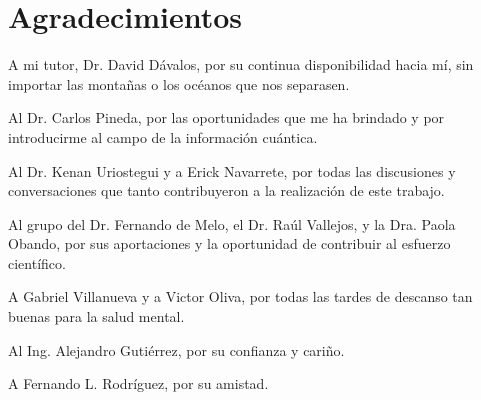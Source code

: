 \section*{Agradecimientos}

A mi tutor, Dr. David Dávalos, por su continua disponibilidad hacia mí, sin importar las montañas o los océanos que nos separasen. 

\vspace{0.2cm}

Al Dr. Carlos Pineda, por las oportunidades que me ha brindado y por introducirme al campo de la información cuántica.

\vspace{0.2cm}

Al Dr. Kenan Uriostegui y a Erick Navarrete, por todas las discusiones y conversaciones que tanto contribuyeron a la realización de este trabajo. 

\vspace{0.2cm}

Al grupo del Dr. Fernando de Melo, el Dr. Raúl Vallejos, y la Dra. Paola Obando, por sus aportaciones y la oportunidad de contribuir al esfuerzo científico.

\vspace{0.2cm}

A Gabriel Villanueva y a Victor Oliva, por todas las tardes de descanso tan buenas para la salud mental.

\vspace{0.2cm}

Al Ing. Alejandro Gutiérrez, por su confianza y cariño. 

\vspace{0.2cm}

A Fernando L. Rodríguez, por su amistad.